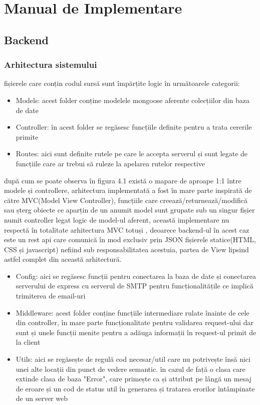 \documentclass[12pt,a4paper,hidelinks]{report}
\theoremstyle{definition}
\theoremstyle{remark}
\begin{document}
\section{Manual de Implementare}
\subsection{Backend}
\subsubsection{Arhitectura sistemului}
fișierele care conțin codul sursă sunt împărțite logic în următoarele categorii:
    \begin{itemize}
        \item {
            Models: acest folder conține modelele mongoose aferente colecțiilor din baza de date
        }
        \item {
            Controller: în acest folder se regăsesc funcțiile definite pentru a trata cererile primite
        }
        \item{
            Routes: aici sunt definite rutele pe care le accepta serverul și sunt legate de funcțiile care ar trebui să ruleze la apelarea rutelor respective
        }
    \end{itemize}
    după cum se poate observa în figura 4.1 există o mapare de aproape 1:1 între modele și controllere,
    arhitectura implementată a fost în mare parte inspirată de către MVC(Model View Controller), funcțiile care creează/returnează/modifică sau șterg
    obiecte ce aparțin de un anumit model sunt grupate sub un singur fișier numit controller legat logic de model-ul aferent, această implementare
    nu respectă în totalitate arhitectura MVC totuși , deoarece backend-ul în acest caz este un rest api care comunică în mod exclusiv prin JSON
    fișierele statice(HTML, CSS și javascript) nefiind sub responsabilitatea acestuia, partea de View lipsind astfel complet din această arhitectură.
    \begin{itemize}
        \item Config: aici se regăsesc funcții pentru conectarea la baza de date 
        și conectarea serverului de express cu serverul de SMTP pentru funcționalitățile ce implică trimiterea de email-uri
        \item Middleware: acest folder conține funcțiile intermediare rulate înainte de cele din controller, în mare parte funcționalitate pentru validarea request-ului
        dar sunt și unele funcții menite pentru a adăuga informații în request-ul primit de la client
        \item Utils: aici se regăsește de regulă cod necesar/util care nu potrivește însă nici unei alte locații din punct de vedere semantic.
        în cazul de față o clasa care extinde clasa de baza "Error", care primește ca și attribut pe lângă un mesaj de eroare și un cod de status
        util în generarea și tratarea erorilor întâmpinate de un server web
    \end{itemize}
\end{document}
